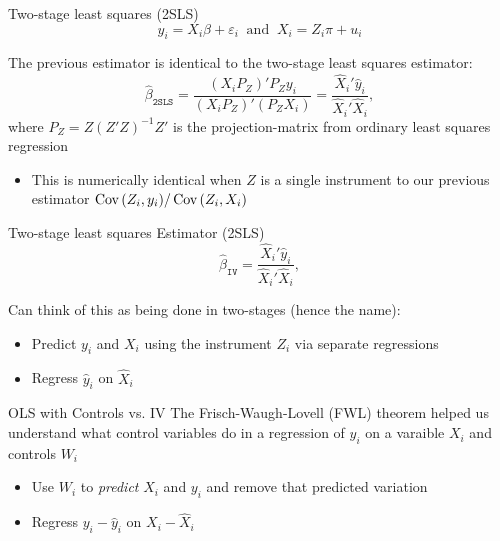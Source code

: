 \documentclass[aspectratio=169,t,11pt,table]{beamer}
\begin{document}
\begin{frame}{Two-stage least squares (2SLS)}
  \vspace{-\bigskipamount}
  $$
    y_i = X_i \beta + \varepsilon_i \ \text{ and }\  X_i = Z_i \pi  + u_i
  $$

  The previous estimator is identical to the two-stage least squares estimator:
  $$
    \hat{\beta}_{\texttt{2SLS}} = \frac{ (X_i P_Z)' P_Z y_i }{ (X_i P_Z)' (P_Z X_i) } = \frac{\hat{X}_i' \hat{y}_i}{\hat{X}_i' \hat{X}_i},
  $$
  where $P_Z = Z (Z'Z)^{-1} Z'$ is the projection-matrix from ordinary least squares regression
  
  \pause
  \begin{itemize}
    \item This is numerically identical when $Z$ is a single instrument to our previous estimator $\cov{Z_i, y_i} / \cov{Z_i, X_i}$
  \end{itemize}
\end{frame}

\begin{frame}{Two-stage least squares Estimator (2SLS)}
  \vspace*{-\bigskipamount}
  $$
    \hat{\beta}_{\texttt{IV}} = \frac{\hat{X}_i' \hat{y}_i}{\hat{X}_i' \hat{X}_i},
  $$

  \bigskip
  Can think of this as being done in two-stages (hence the name):
  \begin{itemize}
    \item Predict $y_i$ and $X_i$ using the instrument $Z_i$ via separate regressions 
    \item Regress $\hat{y}_i$ on $\hat{X}_i$
  \end{itemize}
\end{frame}

\begin{frame}{OLS with Controls vs. IV}
  The Frisch-Waugh-Lovell (FWL) theorem helped us understand what control variables do in a regression of $y_i$ on a varaible $X_i$ and controls $W_i$
  \begin{itemize}
    \item Use $W_i$ to \emph{predict} $X_i$ and $y_i$ and remove that predicted variation
    
    \item Regress $y_i - \hat{y}_i$ on $X_i - \hat{X}_i$
  \end{itemize}
\end{frame}
\end{document}
